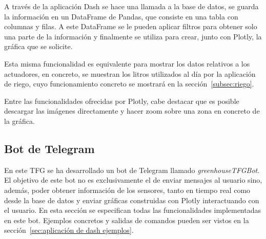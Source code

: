\documentclass[a4paper, 12pt, oneside]{book}
\begin{document}
A través de la aplicación Dash se hace una llamada a la base de datos, se guarda la información en un DataFrame de Pandas, que  consiste en una tabla con columnas y filas. A este DataFrame se le pueden aplicar filtros para obtener solo una parte de la información y finalmente se utiliza para crear, junto con Plotly, la gráfica que se solicite.
%
%
%

Esta misma funcionalidad es equivalente para mostrar los datos relativos a los actuadores, en concreto, se muestran los litros utilizados al día por la aplicación de riego, cuyo funcionamiento concreto se mostrará en la sección~\ref{subsec:riego}.


Entre las funcionalidades ofrecidas por Plotly, cabe destacar que es posible descargar las imágenes directamente y hacer zoom sobre una zona en concreto de la gráfica. 
 

\subsection{Bot de Telegram}
\label{bot de telegram}
En este TFG se ha desarrollado un bot de Telegram llamado \textit{greenhouseTFGBot}. El objetivo de este bot no es exclusivamente el de enviar mensajes al usuario sino, además, poder obtener información de los sensores, tanto en tiempo real como desde la base de datos y enviar gráficas construidas con Plotly interactuando con el usuario. En esta sección se especifican todas las funcionalidades implementadas en este bot. Ejemplos concretos y salidas de comandos pueden ser vistos en la sección~\ref{sec:aplicación de dash ejemplos}.
\end{document}

